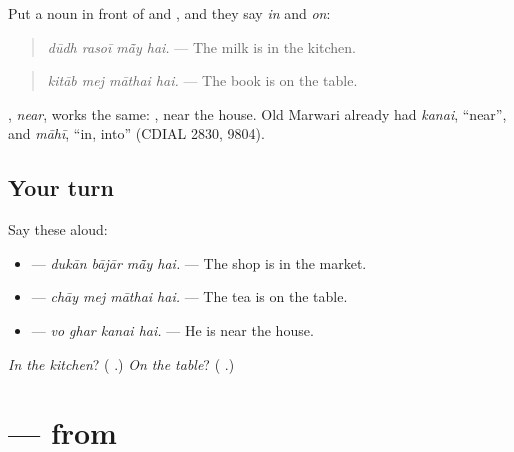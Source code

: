 \begin{grammarlens}[title={Grammar Lens: a noun in front}]
Put a noun in front of \textbf{} and \textbf{}, and they say \emph{in} and \emph{on}:

\begin{quote}
\textbf{   }
\end{quote}

\begin{quote}
\emph{dūdh rasoī mā̃y hai.} — The milk is in the kitchen.
\end{quote}

\begin{quote}
\textbf{   }
\end{quote}

\begin{quote}
\emph{kitāb mej māthai hai.} — The book is on the table.
\end{quote}

\textbf{}, \emph{near}, works the same: \textbf{ }, near the house. Old Marwari already had \emph{kanai}, \textquotedblleft{}near\textquotedblright{}, and \emph{māhī}, \textquotedblleft{}in, into\textquotedblright{} (CDIAL 2830, 9804).
\end{grammarlens}

\subsection*{Your turn}
Say these aloud:

\begin{itemize}
\raggedright
  \item \textbf{   } — \emph{dukān bājār mā̃y hai.} — The shop is in the market.
  \item \textbf{   } — \emph{chāy mej māthai hai.} — The tea is on the table.
  \item \textbf{   } — \emph{vo ghar kanai hai.} — He is near the house.
\end{itemize}

\begin{tcolorbox}[breakable,colback=teal!4,colframe=teal!35!black,title={Before you move on}]
\emph{In the kitchen}? (\textbf{ }.) \emph{On the table}? (\textbf{ }.)
\end{tcolorbox}
\section[\texorpdfstring{\mw{सूं} (sū̃)}{सूं (sū̃)}]{  — from}

